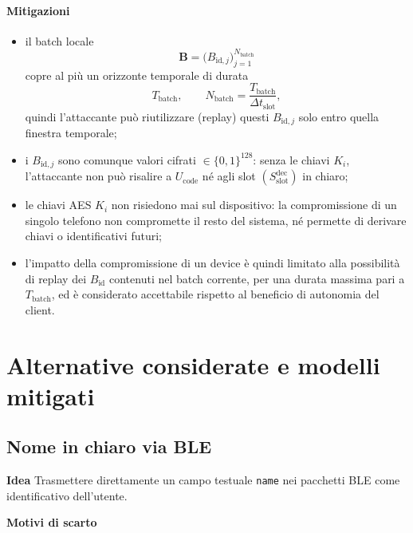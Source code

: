 \documentclass[a4paper,11pt]{article}
\begin{document}
\paragraph{Mitigazioni}
\begin{itemize}
  \item il batch locale
        \[
          \mathbf{B}
          = \bigl(B_{\text{id},j}\bigr)_{j=1}^{N_{\text{batch}}}
        \]
        copre al più un orizzonte temporale di durata
        \[
          T_{\text{batch}},
          \qquad
          N_{\text{batch}} = \frac{T_{\text{batch}}}{\Delta t_{\text{slot}}},
        \]
        quindi l’attaccante può riutilizzare (replay) questi \(B_{\text{id},j}\) solo entro
        quella finestra temporale;
  \item i \(B_{\text{id},j}\) sono comunque valori cifrati
        \(\in \{0,1\}^{128}\): senza le chiavi \(K_i\), l’attaccante non può risalire a
        \(U_{\text{code}}\) né agli slot \((S_{\text{slot}}^{\text{dec}})\) in chiaro;
  \item le chiavi AES \(K_i\) non risiedono mai sul dispositivo: la compromissione di un singolo
        telefono non compromette il resto del sistema, né permette di derivare chiavi o
        identificativi futuri;
  \item l’impatto della compromissione di un device è quindi limitato alla possibilità di replay
        dei \(B_{\text{id}}\) contenuti nel batch corrente, per una durata massima pari a
        \(T_{\text{batch}}\), ed è considerato accettabile rispetto al beneficio di autonomia del client.
\end{itemize}

\section{Alternative considerate e modelli mitigati}
\subsection{Nome in chiaro via BLE}

\textbf{Idea}
Trasmettere direttamente un campo testuale \texttt{name} nei pacchetti
BLE come identificativo dell'utente.

\textbf{Motivi di scarto}
\end{document}
